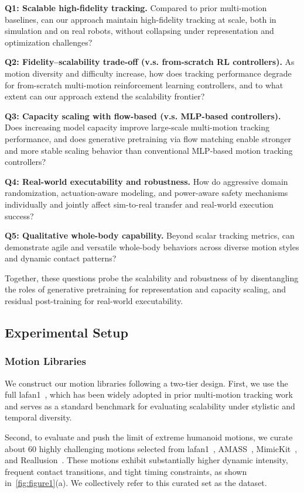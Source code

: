 \noindent\textbf{Q1: Scalable high-fidelity tracking.}
Compared to prior multi-motion baselines, can our approach maintain high-fidelity tracking at scale, both in simulation and on real robots, without collapsing under representation and optimization challenges?

\noindent\textbf{Q2: Fidelity--scalability trade-off (\model v.s. from-scratch RL controllers).}
As motion diversity and difficulty increase, how does tracking performance
degrade for from-scratch multi-motion reinforcement learning controllers, and to what extent can our approach extend the scalability frontier?

\noindent\textbf{Q3: Capacity scaling with flow-based  (\model v.s. MLP-based controllers).}
Does increasing model capacity improve large-scale multi-motion tracking performance, and does generative pretraining via flow matching enable stronger and more stable scaling behavior than conventional MLP-based motion tracking controllers?

\noindent\textbf{Q4: Real-world executability and robustness.}
How do aggressive domain randomization, actuation-aware modeling, and power-aware safety mechanisms individually and jointly affect sim-to-real transfer and real-world execution success?


\noindent\textbf{Q5: Qualitative whole-body capability.}
Beyond scalar tracking metrics, can \model demonstrate agile and versatile whole-body behaviors across diverse motion styles and dynamic contact patterns?

Together, these questions probe the scalability and robustness of \model by disentangling the roles of generative pretraining for representation and capacity scaling, and residual post-training for real-world executability.
\subsection{Experimental Setup}
\subsubsection{Motion Libraries}
We construct our motion libraries following a two-tier design.
First, we use the full \ac{lafan1}~\cite{harvey2020robust}, which has been widely adopted in prior
multi-motion tracking work and serves as a standard benchmark for evaluating scalability
under stylistic and temporal diversity.

Second, to evaluate and push the limit of extreme humanoid motions, we curate about 60 highly challenging motions selected from \ac{lafan1}~\cite{harvey2020robust}, AMASS~\cite{mahmood2019amass}, MimicKit~\cite{peng2025mimickit}, and Reallusion~\cite{reallusion}.
These motions exhibit substantially higher dynamic intensity, frequent contact
transitions, and tight timing constraints, as shown in~\cref{fig:figure1}(a). We collectively refer to this curated set as the \dataset dataset. 

